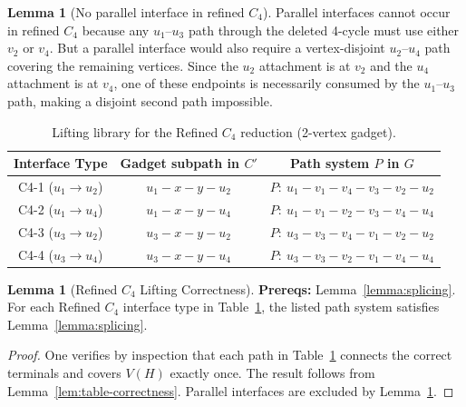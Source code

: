 \documentclass[12pt]{article}
\theoremstyle{definition}
\newtheorem{lemma}[theorem]{Lemma}
\newcommand{\RefinedCFourGadgetVertices}{2}
\begin{document}
\begin{lemma}[No parallel interface in refined $C_4$]
\label{lem:no-parallel-C4}
Parallel interfaces cannot occur in refined $C_4$ because any $u_1$--$u_3$ path through the deleted 4-cycle must use either $v_2$ or $v_4$. But a parallel interface would also require a vertex-disjoint $u_2$--$u_4$ path covering the remaining vertices. Since the $u_2$ attachment is at $v_2$ and the $u_4$ attachment is at $v_4$, one of these endpoints is necessarily consumed by the $u_1$--$u_3$ path, making a disjoint second path impossible.
\end{lemma}

\begin{table}[ht]
\centering
\begin{tabular}{|c|c|c|}
\hline
\textbf{Interface Type} &
\textbf{Gadget subpath in $C'$} &
\textbf{Path system $P$ in $G$} \\
\hline
C4-1 ($u_1 \to u_2$) &
$u_1\!-\!x\!-\!y\!-\!u_2$ &
$P:\ u_1\!-\!v_1\!-\!v_4\!-\!v_3\!-\!v_2\!-\!u_2$\\
\hline
C4-2 ($u_1 \to u_4$) &
$u_1\!-\!x\!-\!y\!-\!u_4$ &
$P:\ u_1\!-\!v_1\!-\!v_2\!-\!v_3\!-\!v_4\!-\!u_4$\\
\hline
C4-3 ($u_3 \to u_2$) &
$u_3\!-\!x\!-\!y\!-\!u_2$ &
$P:\ u_3\!-\!v_3\!-\!v_4\!-\!v_1\!-\!v_2\!-\!u_2$\\
\hline
C4-4 ($u_3 \to u_4$) &
$u_3\!-\!x\!-\!y\!-\!u_4$ &
$P:\ u_3\!-\!v_3\!-\!v_2\!-\!v_1\!-\!v_4\!-\!u_4$\\
\hline
\end{tabular}
\caption{Lifting library for the Refined $C_4$ reduction (\RefinedCFourGadgetVertices-vertex gadget).}
\label{tab:lifting-c4}
\end{table}

\begin{lemma}[Refined $C_4$ Lifting Correctness]
\label{lem:lifting-c4}
\label{lem:lift-C4}
\textbf{Prereqs:} Lemma~\ref{lemma:splicing}.
For each Refined $C_4$ interface type in Table~\ref{tab:lifting-c4}, the listed path
system satisfies Lemma~\ref{lemma:splicing}.
\end{lemma}

\begin{proof}
One verifies by inspection that each path in Table~\ref{tab:lifting-c4} connects the correct terminals and covers $V(H)$ exactly once. The result follows from Lemma~\ref{lem:table-correctness}. Parallel interfaces are excluded by Lemma~\ref{lem:no-parallel-C4}.
\end{proof}
\end{document}
